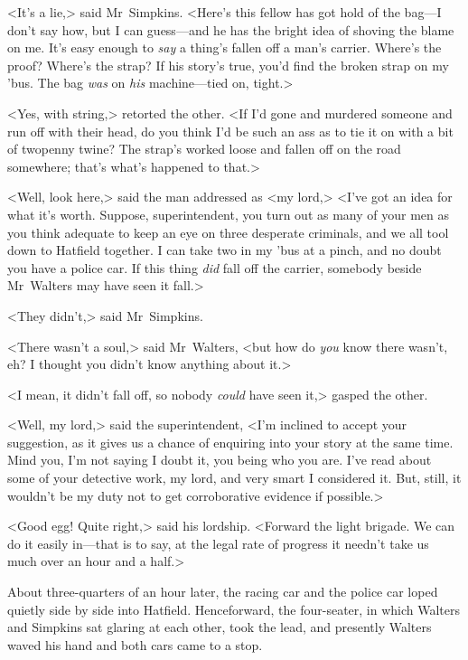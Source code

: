 <It's a lie,> said Mr~Simpkins. <Here's this fellow has got hold of the bag—I don't say how, but I can guess—and he has the bright idea of shoving the blame on me. It's easy enough to \textit{say} a thing's fallen off a man's carrier. Where's the proof? Where's the strap? If his story's true, you'd find the broken strap on my 'bus. The bag \textit{was} on \textit{his} machine—tied on, tight.>

<Yes, with string,> retorted the other. <If I'd gone and murdered someone and run off with their head, do you think I'd be such an ass as to tie it on with a bit of twopenny twine? The strap's worked loose and fallen off on the road somewhere; that's what's happened to that.>

<Well, look here,> said the man addressed as <my lord,> <I've got an idea for what it's worth. Suppose, superintendent, you turn out as many of your men as you think adequate to keep an eye on three desperate criminals, and we all tool down to Hatfield together. I can take two in my 'bus at a pinch, and no doubt you have a police car. If this thing \textit{did} fall off the carrier, somebody beside Mr~Walters may have seen it fall.>

<They didn't,> said Mr~Simpkins.

<There wasn't a soul,> said Mr~Walters, <but how do \textit{you} know there wasn't, eh? I thought you didn't know anything about it.>

<I mean, it didn't fall off, so nobody \textit{could} have seen it,> gasped the other.

<Well, my lord,> said the superintendent, <I'm inclined to accept your suggestion, as it gives us a chance of enquiring into your story at the same time. Mind you, I'm not saying I doubt it, you being who you are. I've read about some of your detective work, my lord, and very smart I considered it. But, still, it wouldn't be my duty not to get corroborative evidence if possible.>

<Good egg! Quite right,> said his lordship. <Forward the light brigade. We can do it easily in—that is to say, at the legal rate of progress it needn't take us much over an hour and a half.>

\divider
About three-quarters of an hour later, the racing car and the police car loped quietly side by side into Hatfield. Henceforward, the four-seater, in which Walters and Simpkins sat glaring at each other, took the lead, and presently Walters waved his hand and both cars came to a stop.

